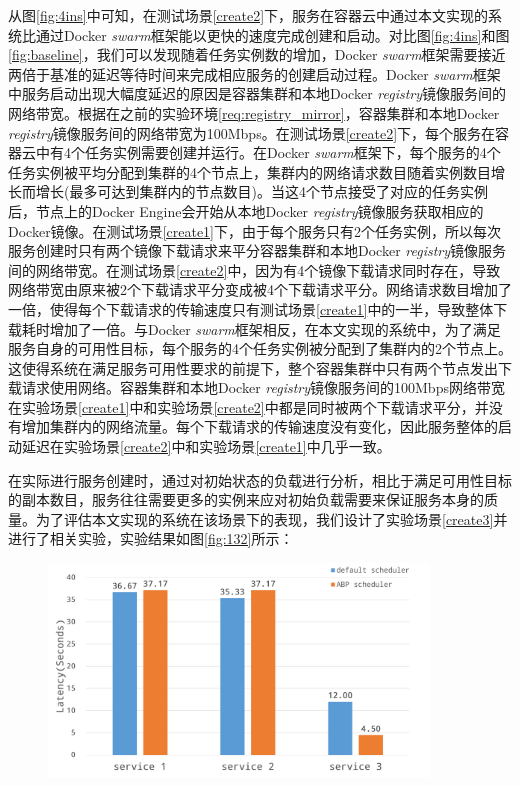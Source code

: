 从图\ref{fig:4ins}中可知，在测试场景\ref{create2}下，服务在容器云中通过本文实现的系统比通过Docker \emph{swarm}框架能以更快的速度完成创建和启动。对比图\ref{fig:4ins}和图\ref{fig:baseline}，我们可以发现随着任务实例数的增加，Docker \emph{swarm}框架需要接近两倍于基准的延迟等待时间来完成相应服务的创建启动过程。Docker \emph{swarm}框架中服务启动出现大幅度延迟的原因是容器集群和本地Docker \emph{registry}镜像服务间的网络带宽。根据在之前的实验环境\ref{req:registry_mirror}，容器集群和本地Docker \emph{registry}镜像服务间的网络带宽为100Mbps。在测试场景\ref{create2}下，每个服务在容器云中有4个任务实例需要创建并运行。在Docker \emph{swarm}框架下，每个服务的4个任务实例被平均分配到集群的4个节点上，集群内的网络请求数目随着实例数目增长而增长(最多可达到集群内的节点数目)。当这4个节点接受了对应的任务实例后，节点上的Docker Engine会开始从本地Docker \emph{registry}镜像服务获取相应的Docker镜像。在测试场景\ref{create1}下，由于每个服务只有2个任务实例，所以每次服务创建时只有两个镜像下载请求来平分容器集群和本地Docker \emph{registry}镜像服务间的网络带宽。在测试场景\ref{create2}中，因为有4个镜像下载请求同时存在，导致网络带宽由原来被2个下载请求平分变成被4个下载请求平分。网络请求数目增加了一倍，使得每个下载请求的传输速度只有测试场景\ref{create1}中的一半，导致整体下载耗时增加了一倍。与Docker \emph{swarm}框架相反，在本文实现的系统中，为了满足服务自身的可用性目标，每个服务的4个任务实例被分配到了集群内的2个节点上。这使得系统在满足服务可用性要求的前提下，整个容器集群中只有两个节点发出下载请求使用网络。容器集群和本地Docker \emph{registry}镜像服务间的100Mbps网络带宽在实验场景\ref{create1}中和实验场景\ref{create2}中都是同时被两个下载请求平分，并没有增加集群内的网络流量。每个下载请求的传输速度没有变化，因此服务整体的启动延迟在实验场景\ref{create2}中和实验场景\ref{create1}中几乎一致。

在实际进行服务创建时，通过对初始状态的负载进行分析，相比于满足可用性目标的副本数目，服务往往需要更多的实例来应对初始负载需要来保证服务本身的质量。为了评估本文实现的系统在该场景下的表现，我们设计了实验场景\ref{create3}并进行了相关实验，实验结果如图\ref{fig:132}所示：
\begin{figure}[H]
\centering
\includegraphics[width=0.9\textwidth]{./figure/132}
\end{figure}


